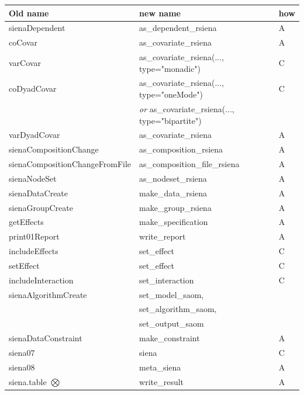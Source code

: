 \documentclass[a4paper,fleqn,11pt]{article}
\newcommand{\+}{\, + \,}
\begin{document}
\begin{table}
  \centering
\begin{tabular}{lll}
Old name  & new name & how \\
\hline
 sienaDependent         &  as\_dependent\_rsiena     & A\\
 coCovar                &  as\_covariate\_rsiena     & A \\
 varCovar               &  as\_covariate\_rsiena(..., type="monadic")     &  C \\
 coDyadCovar            &  as\_covariate\_rsiena(..., type="oneMode")     &  C \\
                        &  \emph{or} as\_covariate\_rsiena(..., type="bipartite")     &  \\
 varDyadCovar           &  as\_covariate\_rsiena     &  A \\
 sienaCompositionChange &  as\_composition\_rsiena   &  A \\
 sienaCompositionChangeFromFile &  as\_composition\_file\_rsiena  & A \\
 sienaNodeSet           & as\_nodeset\_rsiena        &  A \\
 sienaDataCreate        & make\_data\_rsiena         &  A \\
 sienaGroupCreate       & make\_group\_rsiena        &  A \\
 getEffects             & make\_specification        &  A \\
 print01Report          & write\_report              &  A  \\
 includeEffects         & set\_effect                &  C  \\
 setEffect              & set\_effect                &  C \\
 includeInteraction     & set\_interaction           &  C \\
 sienaAlgorithmCreate   & set\_model\_saom,          &  \\
                        & set\_algorithm\_saom,      &  \\
                        & set\_output\_saom          &  \\
 sienaDataConstraint    & make\_constraint           &  A \\
 siena07                & siena                      &  C \\
 siena08                & meta\_siena                &  A \\
 siena.table  $\bigotimes$      & write\_result      &  A \\

\end{tabular}
\end{table}
\end{document}

